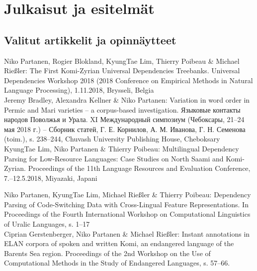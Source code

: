 \documentclass[11pt, a4paper]{article}
\newcommand{\years}[1]{\marginnote{\scriptsize #1}} %
\begin{document}

\section*{Julkaisut ja esitelmät}

\subsection*{Valitut artikkelit ja opinnäytteet}

\years{hyväksytty} Niko Partanen, Rogier Blokland, KyungTae Lim, Thierry Poibeau \& Michael Rießler: The First Komi-Zyrian Universal Dependencies Treebanks. Universal Dependencies Workshop 2018 (2018 Conference on Empirical Methods in Natural Language Processing), 1.11.2018, Brysseli, Belgia\\

\years{2018} Jeremy Bradley, Alexandra Kellner \& Niko Partanen: Variation in word order in Permic and Mari varieties – a corpus-based investigation. Языковые контакты народов Поволжья и Урала. XI Международный симпозиум (Чебоксары, 21–24 мая 2018 г.) – Сборник статей, Г. Е. Корнилов, А. М. Иванова, Г. Н. Семенова (toim.), s. 238–244, Chuvash University Publishing House, Cheboksary\\

\years{2018} KyungTae Lim, Niko Partanen \& Thierry Poibeau: Multilingual Dependency Parsing for Low-Resource Languages: Case Studies on North Saami and Komi-Zyrian. Proceedings of the 11th Language Resources and Evaluation Conference, 7.--12.5.2018, Miyazaki, Japani

\years{2018} Niko Partanen, KyungTae Lim, Michael Rießler \& Thierry Poibeau: Dependency Parsing of Code-Switching Data with Cross-Lingual Feature Representations. In Proceedings of the Fourth International Workshop on Computational Linguistics of Uralic Languages, s. 1--17\\


\years{2017} Ciprian Gerstenberger, Niko Partanen \& Michael Rießler: Instant annotations in ELAN corpora of spoken and written Komi, an endangered language of the Barents Sea region. Proceedings of the 2nd Workshop on the Use of Computational Methods in the Study of Endangered Languages, s. 57--66. \\
\end{document}
